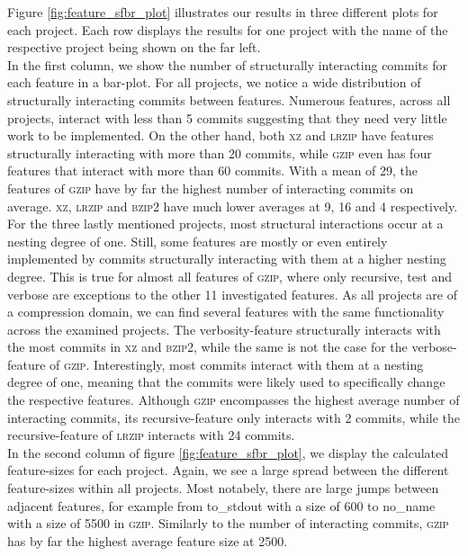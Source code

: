Figure \ref{fig:feature_sfbr_plot} illustrates our results in three different plots for each project.
Each row displays the results for one project with the name of the respective project being shown on the far left. \\
In the first column, we show the number of structurally interacting commits for each feature in a bar-plot.
For all projects, we notice a wide distribution of structurally interacting commits between features.
Numerous features, across all projects, interact with less than 5 commits suggesting that they need very little work to be implemented.
On the other hand, both \textsc{xz} and \textsc{lrzip} have features structurally interacting with more than 20 commits, while \textsc{gzip} even has four features that interact with more than 60 commits.
With a mean of 29, the features of \textsc{gzip} have by far the highest number of interacting commits on average.
\textsc{xz}, \textsc{lrzip} and \textsc{bzip2} have much lower averages at 9, 16 and 4 respectively.
For the three lastly mentioned projects, most structural interactions occur at a nesting degree of one.
Still, some features are mostly or even entirely implemented by commits structurally interacting with them at a higher nesting degree.
This is true for almost all features of \textsc{gzip}, where only \textsf{recursive}, \textsf{test} and \textsf{verbose} are exceptions to the other 11 investigated features.
As all projects are of a compression domain, we can find several features with the same functionality across the examined projects.
The \textsf{verbosity}-feature structurally interacts with the most commits in \textsc{xz} and \textsc{bzip2}, while the same is not the case for the \textsf{verbose}-feature of \textsc{gzip}. 
Interestingly, most commits interact with them at a nesting degree of one, meaning that the commits were likely used to specifically change the respective features. 
Although \textsc{gzip} encompasses the highest average number of interacting commits, its \textsf{recursive}-feature only interacts with 2 commits, while the \textsf{recursive}-feature of \textsc{lrzip} interacts with 24 commits. \\
In the second column of figure \ref{fig:feature_sfbr_plot}, we display the calculated feature-sizes for each project.
Again, we see a large spread between the different feature-sizes within all projects.
Most notabely, there are large jumps between adjacent features, for example from \textsf{to\_stdout} with a size of 600 to \textsf{no\_name} with a size of 5500 in \textsc{gzip}.
Similarly to the number of interacting commits, \textsc{gzip} has by far the highest average feature size at 2500.
